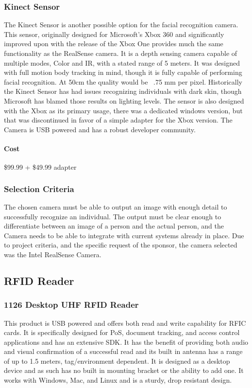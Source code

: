 \documentclass[10pt, onecolumn, twoside, peerreview]{IEEEtran}
\begin{document}
\subsubsection{Kinect Sensor}
The Kinect Sensor is another possible option for the facial recognition camera. This sensor, originally designed for
Microsoft’s Xbox 360 and significantly improved upon with the release of the Xbox One provides much the same
functionality as the RealSense camera. It is a depth sensing camera capable of multiple modes, Color and IR, with a
stated range of 5 meters. It was designed with full motion body tracking in mind, though it is fully capable of
performing facial recognition. At 50cm the quality would be ~.75 mm per pixel. Historically the Kinect Sensor has had
issues recognizing individuals with dark skin, though Microsoft has blamed those results on lighting levels. The sensor
is also designed with the Xbox as its primary usage, there was a dedicated windows version, but that was discontinued
in favor of a simple adapter for the Xbox version. The Camera is USB powered and has a robust developer community.
\paragraph{Cost} \$99.99 + \$49.99 adapter\\

\subsubsection{Selection Criteria}
The chosen camera must be able to output an image with enough detail to successfully recognize an individual. The
output must be clear enough to differentiate between an image of a person and the actual person, and the Camera needs
to be able to integrate with current systems already in place. Due to project criteria, and the specific request of the
sponsor, the camera selected was the Intel RealSense Camera.

\subsection{RFID Reader}

\subsubsection{1126 Desktop UHF RFID Reader}
This product is USB powered and offers both read and write capability for RFIC cards. It is specifically designed for
PoS, document tracking, and access control applications and has an extensive SDK. It has the benefit of providing both
audio and visual confirmation of a successful read and its built in antenna has a range of up to 1.5 meters,
tag/environment dependent. It is designed as a desktop device and as such has no built in mounting bracket or the
ability to add one. It works with Windows, Mac, and Linux and is a sturdy, drop resistant design.\\
\end{document}
